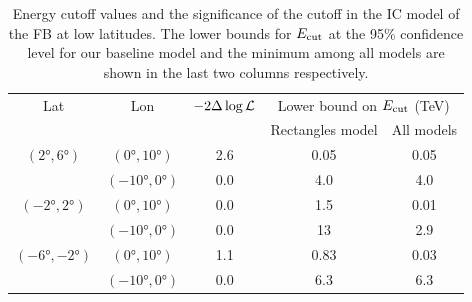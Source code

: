 %

\begin{table}
  \begin{center}
    \caption{Energy cutoff values and the significance of the cutoff in the IC model of the FB at low latitudes.
The lower bounds for $E_{\text{cut}}$ at the 95\% confidence level for our baseline model and the minimum among all
models are shown in the last two columns respectively.
}
    \label{tab:IC}
    \begin{tabular}{|c|c|c|c|c|} %
     	\hline
		 Lat & Lon  & $-2 \Delta \log {\mathcal{L}}$ & \multicolumn{2}{c|}{Lower bound on $E_{\text{cut}}$ (TeV) } \\ 
		       &        &                                  &  \multicolumn{1}{c}{Rectangles model} & All models \\ 
		\hline
  		$(\ang{2}, \ang{6})$ & $(\ang{0}, \ang{10})$ & 2.6  & 0.05 & 0.05 \\ 
		& $(\ang{-10}, \ang{0})$ & 0.0  & 4.0  & 4.0 \\ 
 		\hline
  		$(\ang{-2}, \ang{2})$ & $(\ang{0}, \ang{10})$ & 0.0 & 1.5 & 0.01 \\ 
		& $(\ang{-10}, \ang{0})$ & 0.0 & 13  & 2.9  \\ 
 		\hline
  		$(\ang{-6}, \ang{-2})$ & $(\ang{0}, \ang{10})$ & 1.1 & 0.83 & 0.03 \\ 
		& $(\ang{-10}, \ang{0})$& 0.0 & 6.3 & 6.3\\ 
 \hline
    \end{tabular}
  \end{center}
\end{table}




